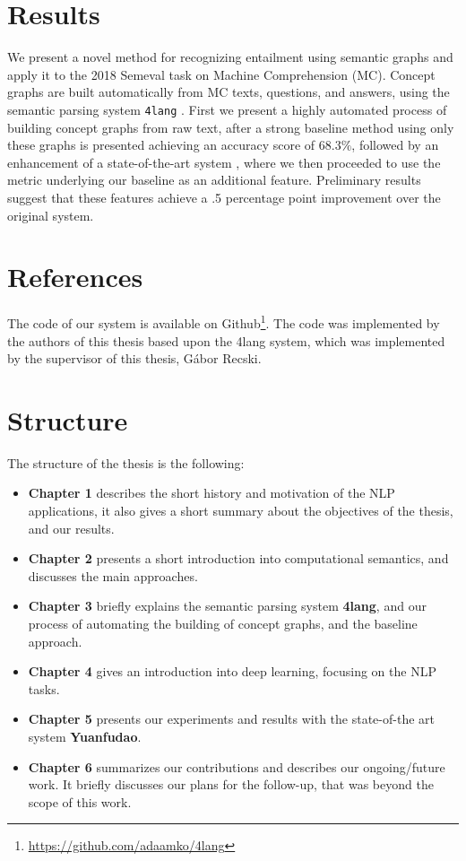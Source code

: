 \section{Results}
We present a novel method for recognizing entailment using semantic
graphs and apply it to the 2018 Semeval task on Machine
Comprehension (MC).
Concept graphs are built automatically from MC texts, questions, and answers,
using the semantic parsing system \texttt{4lang} \cite{Recski:2016d}.
First we present a highly automated process of building concept graphs from raw text, after
a strong baseline method using only these graphs is presented achieving an accuracy score of $68.3\%$,
followed by an enhancement of a state-of-the-art system
\cite{Wang:2018}, where we then proceeded to use the metric underlying our baseline as an
additional feature. Preliminary results suggest that these features
achieve a .5 percentage point improvement over the original system.
 


\section{References}
The code of our system is available on Github\footnote{\url{https://github.com/adaamko/4lang}}. The code was implemented by the authors of this thesis based upon the 4lang system, which was implemented by the supervisor of this thesis, Gábor Recski.

\section{Structure}
The structure of the thesis is the following:
\begin{itemize}
	\item \textbf{Chapter 1} describes the short history and motivation of the NLP applications, it also gives a short summary about the objectives of the thesis, and our results.
	\item \textbf{Chapter 2} presents a short introduction into computational semantics, and discusses the main approaches.
	\item \textbf{Chapter 3} briefly explains the semantic parsing system \textbf{4lang}, and our process of automating the building of concept graphs, and the baseline approach.
	\item \textbf{Chapter 4} gives an introduction into deep learning, focusing on the NLP tasks.
	\item \textbf{Chapter 5} presents our experiments and results with the state-of-the art system \textbf{Yuanfudao}.
	\item \textbf{Chapter 6} summarizes our contributions and describes our ongoing/future work. It briefly discusses our plans for the follow-up, that was beyond the scope of this work.
\end{itemize}